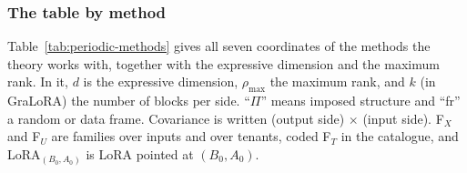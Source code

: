 \subsubsection{The table by method}\label{sec:atlas-methods}

Table~\ref{tab:periodic-methods} gives all seven coordinates of the methods the theory works with, together with the
expressive dimension and the maximum rank. In it, $d$ is the expressive dimension, $\rho_{\max}$ the maximum rank, and $k$
(in GraLoRA) the number of blocks per side. ``$\Pi$'' means imposed structure and ``fr'' a random or data frame.
Covariance is written (output side) $\times$ (input side). F$_X$ and F$_U$ are families over inputs and over tenants,
coded F$_T$ in the catalogue, and LoRA$_{(B_0,A_0)}$ is LoRA pointed at $(B_0,A_0)$.

\begingroup\scriptsize\setlength{\tabcolsep}{1.6pt}\renewcommand{\arraystretch}{1.1}%
\newcommand*{\ptn}[1]{\textsuperscript{\sffamily\bfseries\color{tide}#1}}%

